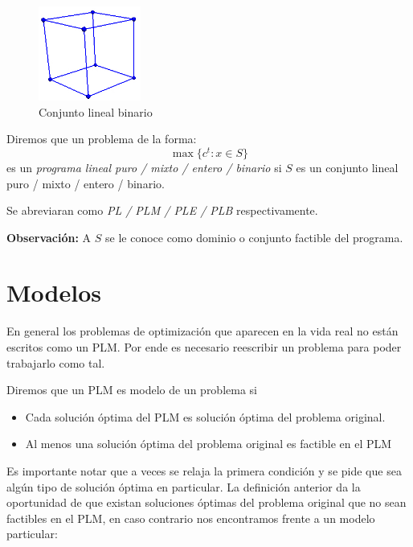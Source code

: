 \newpage
\begin{figure}
    \centering
    \includegraphics[width=0.3\textwidth]{cube3.jpg}
    \caption{Conjunto lineal binario}
\end{figure}
\begin{defi} Diremos que un problema de la forma:
$$
\max\{c^{t}\colon x \in S\}
$$
es un \emph{programa lineal puro / mixto / entero / binario} si $S$ es un conjunto lineal puro / mixto / entero / binario. 
\end{defi}

Se abreviaran como \emph{PL / PLM / PLE / PLB} respectivamente.

\textbf{Observación:} A $S$ se le conoce como dominio o conjunto factible del programa.
\section{Modelos}

En general los problemas de optimización que aparecen en la vida real no están escritos como un PLM. Por ende es necesario reescribir un problema para poder trabajarlo como tal.

\begin{defi}[Modelo] Diremos que un PLM es modelo de un problema si

\begin{itemize}
    \item Cada solución óptima del PLM es solución óptima del problema original.
    \item Al menos una solución óptima del problema original es factible en el PLM
\end{itemize}
\end{defi}

Es importante notar que a veces se relaja la primera condición y se pide que sea algún tipo de solución óptima en particular. La definición anterior da la oportunidad de que existan soluciones óptimas del problema original que no sean factibles en el PLM, en caso contrario nos encontramos frente a un modelo particular:

